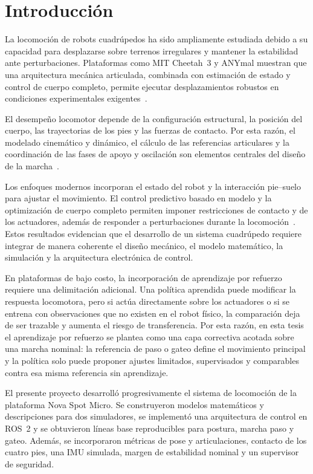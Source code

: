 \chapter{Introducción}

La locomoción de robots cuadrúpedos ha sido ampliamente estudiada debido a su capacidad para desplazarse sobre terrenos irregulares y mantener la estabilidad ante perturbaciones. Plataformas como MIT Cheetah~3 y ANYmal muestran que una arquitectura mecánica articulada, combinada con estimación de estado y control de cuerpo completo, permite ejecutar desplazamientos robustos en condiciones experimentales exigentes~\cite{bledt2018cheetah3,hutter2016anymal}.

El desempeño locomotor depende de la configuración estructural, la posición del cuerpo, las trayectorias de los pies y las fuerzas de contacto. Por esta razón, el modelado cinemático y dinámico, el cálculo de las referencias articulares y la coordinación de las fases de apoyo y oscilación son elementos centrales del diseño de la marcha~\cite{zamani2011dynamics,bellicoso2018dynamic}.

Los enfoques modernos incorporan el estado del robot y la interacción pie--suelo para ajustar el movimiento. El control predictivo basado en modelo y la optimización de cuerpo completo permiten imponer restricciones de contacto y de los actuadores, además de responder a perturbaciones durante la locomoción~\cite{dicarlo2018mpc,neunert2018wholebody}. Estos resultados evidencian que el desarrollo de un sistema cuadrúpedo requiere integrar de manera coherente el diseño mecánico, el modelo matemático, la simulación y la arquitectura electrónica de control.

En plataformas de bajo costo, la incorporación de aprendizaje por refuerzo
requiere una delimitación adicional. Una política aprendida puede modificar la
respuesta locomotora, pero si actúa directamente sobre los actuadores o si se
entrena con observaciones que no existen en el robot físico, la comparación
deja de ser trazable y aumenta el riesgo de transferencia. Por esta razón, en
esta tesis el aprendizaje por refuerzo se plantea como una capa correctiva
acotada sobre una marcha nominal: la referencia de paso o gateo define el
movimiento principal y la política solo puede proponer ajustes limitados,
supervisados y comparables contra esa misma referencia sin aprendizaje.

El presente proyecto desarrolló progresivamente el sistema de locomoción de la
plataforma Nova Spot Micro. Se construyeron modelos matemáticos y descripciones
para dos simuladores, se implementó una arquitectura de control en ROS~2 y se
obtuvieron líneas base reproducibles para postura, marcha paso y gateo. Además,
se incorporaron métricas de pose y articulaciones, contacto de los cuatro pies,
una IMU simulada, margen de estabilidad nominal y un supervisor de seguridad.

